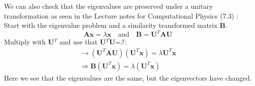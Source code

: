 \documentclass[12pt,a4paper,english]{article}
\begin{document}
We can also check that the eigenvalues are preserved under a unitary transformation as seen in the Lecture notes for Computational Physics (7.3) \cite{lectures}:\\
Start with the eigenvalue problem and a similarity transformed matrix \textbf{B}. \[\textbf{Ax}=\lambda\textbf{x}\quad \text{and}\quad \textbf{B}=\textbf{U}^T\textbf{A}\textbf{U}\]
Multiply with \textbf{U}$^T$ and use that \textbf{U}$^T$\textbf{U}=$\mathcal{I}$:
\begin{align*}
\rightarrow (\textbf{U}^T\textbf{A}\textbf{U})(\textbf{U}^T\textbf{x})=\lambda\textbf{U}^T\textbf{x}\\
\Rightarrow \textbf{B}(\textbf{U}^T\textbf{x})=\lambda(\textbf{U}^T\textbf{x})
\end{align*}
Here we see that the eigenvalues are the same, but the eigenvectors have changed.
\end{document}
